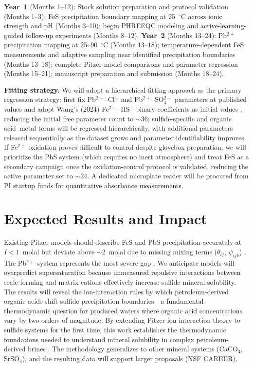\documentclass[12pt]{article}
\begin{document}
\textbf{Year~1} (Months 1--12): Stock solution preparation and protocol validation (Months 1--3); FeS precipitation boundary mapping at 25~$^\circ$C across ionic strength and pH (Months 3--10); begin PHREEQC modeling and active-learning-guided follow-up experiments (Months 8--12). \textbf{Year~2} (Months 13--24): Pb$^{2+}$ precipitation mapping at 25--90~$^\circ$C (Months 13--18); temperature-dependent FeS measurements and adaptive sampling near identified precipitation boundaries (Months 13--18); complete Pitzer-model comparisons and parameter regression (Months 15--21); manuscript preparation and submission (Months 18--24).

\textbf{Fitting strategy.} We will adopt a hierarchical fitting approach as the primary regression strategy: first fix Pb$^{2+}$--Cl$^-$ and Pb$^{2+}$--SO$_4^{2-}$ parameters at published values \cite{felmy2000,woosley2013,mgaidi1991} and adopt Wang's (2024) Fe$^{2+}$--HS$^-$ binary coefficients as initial values \cite{wang2024}, reducing the initial free parameter count to $\sim$36; sulfide-specific and organic acid--metal terms will be regressed hierarchically, with additional parameters released sequentially as the dataset grows and parameter identifiability improves. If Fe$^{2+}$ oxidation proves difficult to control despite glovebox preparation, we will prioritize the PbS system (which requires no inert atmosphere) and treat FeS as a secondary campaign once the oxidation-control protocol is validated, reducing the active parameter set to $\sim$24. A dedicated microplate reader will be procured from PI startup funds for quantitative absorbance measurements.

\section{Expected Results and Impact}

Existing Pitzer models should describe FeS and PbS precipitation accurately at $I < 1$~molal but deviate above $\sim$2~molal due to missing mixing terms ($\theta_{ij}$, $\psi_{ijk}$) \cite{kan2019}. The Pb$^{2+}$ system represents the most severe gap \cite{felmy2000}. We anticipate models will overpredict supersaturation because unmeasured repulsive interactions between scale-forming and matrix cations effectively increase sulfide-mineral solubility. The results will reveal the ion-interaction rules by which petroleum-derived organic acids shift sulfide precipitation boundaries---a fundamental thermodynamic question for produced waters where organic acid concentrations vary by two orders of magnitude. By extending Pitzer ion-interaction theory to sulfide systems for the first time, this work establishes the thermodynamic foundations needed to understand mineral solubility in complex petroleum-derived brines \cite{kan2019}. The methodology generalizes to other mineral systems (CaCO$_3$, SrSO$_4$), and the resulting data will support larger proposals (NSF CAREER).
\end{document}
